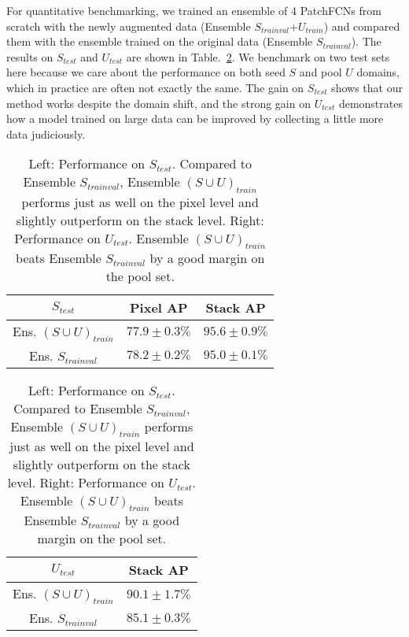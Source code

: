 \documentclass{llncs}
\begin{document}
For quantitative benchmarking, we trained an ensemble of 4 PatchFCNs from scratch with the newly augmented data (Ensemble $S_{trainval}$+$U_{train}$) and compared them with the ensemble trained on the original data (Ensemble $S_{trainval}$). The results on $S_{test}$ and $U_{test}$ are shown in Table.~\ref{table:unlabel}. We benchmark on two test sets here because we care about the performance on both seed $S$ and pool $U$ domains, which in practice are often not exactly the same. The gain on $S_{test}$ shows that our method works despite the domain shift, and the strong gain on $U_{test}$ demonstrates how a model trained on large data can be improved by collecting a little more data judiciously. 
\begin{table}[t]
     \centering
     \def\arraystretch{1.25}\tabcolsep=3pt
     \begin{tabular}{|c | c c |} 
     \hline
     $S_{test}$ & Pixel AP & Stack AP\\
     \hline\hline
     Ens. $(S \cup U)_{train}$	& $77.9 \pm 0.3\%$ & $\mathbf{95.6 \pm 0.9\%}$\\
     \hline
     Ens. $S_{trainval}$ & $\mathbf{78.2 \pm 0.2\%}$ & $95.0 \pm 0.1\%$ \\
     \hline
     \end{tabular}
     \begin{tabular}{|c | c |} 
     \hline
     $U_{test}$ & Stack AP\\
     \hline\hline
     Ens. $(S \cup U)_{train}$	& $\mathbf{90.1 \pm 1.7\%}$ \\
     \hline
     Ens. $S_{trainval}$ & $85.1 \pm 0.3\%$ \\
     \hline
     \end{tabular}         
    \caption{Left: Performance on $S_{test}$. Compared to Ensemble $S_{trainval}$, Ensemble $(S \cup U)_{train}$ performs just as well on the pixel level and slightly outperform on the stack level. Right: Performance on $U_{test}$. Ensemble $(S \cup U)_{train}$ beats Ensemble $S_{trainval}$ by a good margin on the pool set.}
    \label{table:unlabel}
    \vspace*{-0.8cm}
\end{table}


\end{document}
